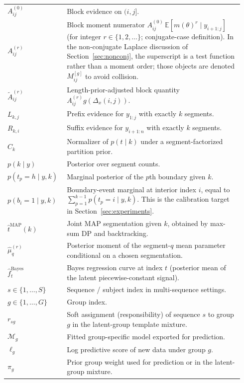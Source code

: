 \begin{longtable}{@{}p{0.22\linewidth}p{0.72\linewidth}@{}}
$A^{(0)}_{ij}$ & Block evidence on $(i,j]$. \\
$A^{(r)}_{ij}$ & Block moment numerator $A^{(0)}_{ij}\,\mathbb{E}[m(\theta)^r\mid y_{i+1:j}]$ (for integer $r\in\{1,2,\dots\}$; conjugate-case definition). In the non-conjugate Laplace discussion of Section~\ref{sec:nonconj}, the superscript is a test function rather than a moment order; those objects are denoted $M^{[g]}_{ij}$ to avoid collision. \\
$\widetilde A^{(r)}_{ij}$ & Length-prior-adjusted block quantity $A^{(r)}_{ij}g(\Delta_x(i,j))$. \\
\midrule
$L_{k,j}$ & Prefix evidence for $y_{1:j}$ with exactly $k$ segments. \\
$R_{k,i}$ & Suffix evidence for $y_{i+1:n}$ with exactly $k$ segments. \\
$C_k$ & Normalizer of $p(t\mid k)$ under a segment-factorized partition prior. \\
$p(k\mid y)$ & Posterior over segment counts. \\
$p(t_p=h\mid y,k)$ & Marginal posterior of the $p$th boundary given $k$. \\
$p(b_i=1\mid y,k)$ & Boundary-event marginal at interior index $i$, equal to $\sum_{p=1}^{k-1} p(t_p=i\mid y,k)$. This is the calibration target in Section~\ref{sec:experiments}. \\
\midrule
$\widehat t^{\mathrm{MAP}}(k)$ & Joint MAP segmentation given $k$, obtained by max-sum DP and backtracking. \\
$\widehat\mu_q^{(r)}$ & Posterior moment of the segment-$q$ mean parameter conditional on a chosen segmentation. \\
$\widehat f_t^{\mathrm{Bayes}}$ & Bayes regression curve at index $t$ (posterior mean of the latent piecewise-constant signal). \\
\midrule
$s\in\{1,\dots,S\}$ & Sequence / subject index in multi-sequence settings. \\
$g\in\{1,\dots,G\}$ & Group index. \\
$r_{sg}$ & Soft assignment (responsibility) of sequence $s$ to group $g$ in the latent-group template mixture. \\
\midrule
$\mathcal{M}_g$ & Fitted group-specific model exported for prediction. \\
$\ell_g$ & Log predictive score of new data under group $g$. \\
$\pi_g$ & Prior group weight used for prediction or in the latent-group mixture. \\

\end{longtable}
